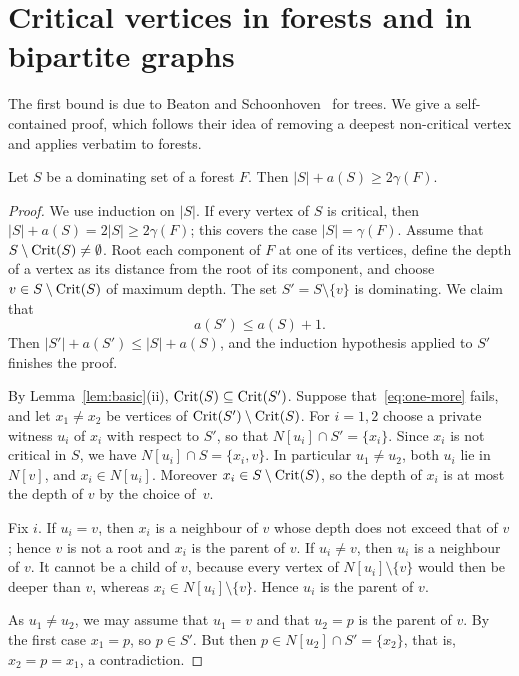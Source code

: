\section{Critical vertices in forests and in bipartite graphs}\label{sec:critical}

The first bound is due to Beaton and Schoonhoven~\cite[Lemma~5]{BS} for
trees. We give a self-contained proof, which follows their idea of removing
a deepest non-critical vertex and applies verbatim to forests.

\begin{lemma}\label{lem:lower}
Let $S$ be a dominating set of a forest $F$. Then
$|S|+a(S)\ge 2\gamma(F)$.
\end{lemma}

\begin{proof}
We use induction on $|S|$. If every vertex of $S$ is critical, then
$|S|+a(S)=2|S|\ge2\gamma(F)$; this covers the case $|S|=\gamma(F)$. Assume
that $S\setminus\operatorname{Crit}(S)\ne\emptyset$. Root each component of $F$ at one of
its vertices, define the depth of a vertex as its distance from the root of
its component, and choose $v\in S\setminus\operatorname{Crit}(S)$ of maximum depth. The
set $S'=S\setminus\{v\}$ is dominating. We claim that
\begin{equation}\label{eq:one-more}
  a(S')\le a(S)+1 .
\end{equation}
Then $|S'|+a(S')\le|S|+a(S)$, and the induction hypothesis applied to $S'$
finishes the proof.

By Lemma~\ref{lem:basic}(ii), $\operatorname{Crit}(S)\subseteq\operatorname{Crit}(S')$. Suppose
that~\eqref{eq:one-more} fails, and let $x_1\ne x_2$ be vertices of
$\operatorname{Crit}(S')\setminus\operatorname{Crit}(S)$. For $i=1,2$ choose a private witness $u_i$ of
$x_i$ with respect to $S'$, so that $N[u_i]\cap S'=\{x_i\}$. Since $x_i$ is
not critical in $S$, we have $N[u_i]\cap S=\{x_i,v\}$. In particular
$u_1\ne u_2$, both $u_i$ lie in $N[v]$, and $x_i\in N[u_i]$. Moreover
$x_i\in S\setminus\operatorname{Crit}(S)$, so the depth of $x_i$ is at most the depth of
$v$ by the choice of~$v$.

Fix $i$. If $u_i=v$, then $x_i$ is a neighbour of $v$ whose depth does not
exceed that of $v$; hence $v$ is not a root and $x_i$ is the parent of $v$.
If $u_i\ne v$, then $u_i$ is a neighbour of $v$. It cannot be a child of
$v$, because every vertex of $N[u_i]\setminus\{v\}$ would then be deeper than
$v$, whereas $x_i\in N[u_i]\setminus\{v\}$. Hence $u_i$ is the parent of $v$.

As $u_1\ne u_2$, we may assume that $u_1=v$ and that $u_2=p$ is the parent of
$v$. By the first case $x_1=p$, so $p\in S'$. But then
$p\in N[u_2]\cap S'=\{x_2\}$, that is, $x_2=p=x_1$, a contradiction.
\end{proof}

